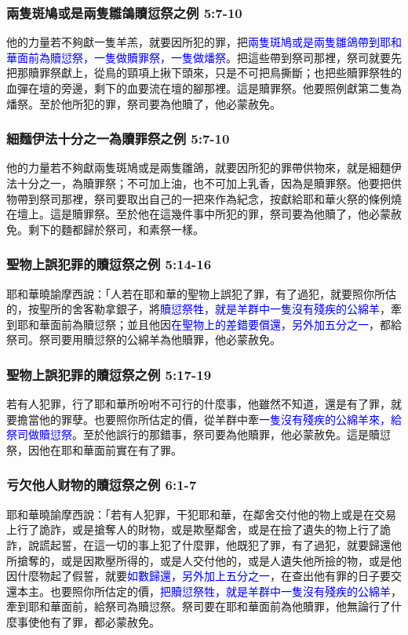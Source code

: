 \subsubsection{兩隻斑鳩或是兩隻雛鴿贖愆祭之例 5:7-10}
他的力量若不夠獻一隻羊羔，就要因所犯的罪，把\textcolor{blue}{兩隻斑鳩或是兩隻雛鴿帶到耶和華面前為贖愆祭，一隻做贖罪祭，一隻做燔祭}。把這些帶到祭司那裡，祭司就要先把那贖罪祭獻上，從鳥的頸項上揪下頭來，只是不可把鳥撕斷；也把些贖罪祭牲的血彈在壇的旁邊，剩下的血要流在壇的腳那裡。這是贖罪祭。他要照例獻第二隻為燔祭。至於他所犯的罪，祭司要為他贖了，他必蒙赦免。

\subsubsection{細麵伊法十分之一為贖罪祭之例 5:7-10}
他的力量若不夠獻兩隻斑鳩或是兩隻雛鴿，就要因所犯的罪帶供物來，就是細麵伊法十分之一，為贖罪祭；不可加上油，也不可加上乳香，因為是贖罪祭。他要把供物帶到祭司那裡，祭司要取出自己的一把來作為紀念，按獻給耶和華火祭的條例燒在壇上。這是贖罪祭。至於他在這幾件事中所犯的罪，祭司要為他贖了，他必蒙赦免。剩下的麵都歸於祭司，和素祭一樣。

\subsubsection{聖物上誤犯罪的贖愆祭之例 5:14-16}
耶和華曉諭摩西說：「人若在耶和華的聖物上誤犯了罪，有了過犯，就要照你所估的，按聖所的舍客勒拿銀子，將\textcolor{blue}{贖愆祭牲，就是羊群中一隻沒有殘疾的公綿羊}，牽到耶和華面前為贖愆祭；並且他因\textcolor{blue}{在聖物上的差錯要償還，另外加五分之一}，都給祭司。祭司要用贖愆祭的公綿羊為他贖罪，他必蒙赦免。

\subsubsection{聖物上誤犯罪的贖愆祭之例 5:17-19}
若有人犯罪，行了耶和華所吩咐不可行的什麼事，他雖然不知道，還是有了罪，就要擔當他的罪孽。也要照你所估定的價，從羊群中牽\textcolor{blue}{一隻沒有殘疾的公綿羊來，給祭司做贖愆祭}。至於他誤行的那錯事，祭司要為他贖罪，他必蒙赦免。這是贖愆祭，因他在耶和華面前實在有了罪。

\subsubsection{亏欠他人财物的贖愆祭之例 6:1-7}
耶和華曉諭摩西說：「若有人犯罪，干犯耶和華，在鄰舍交付他的物上或是在交易上行了詭詐，或是搶奪人的財物，或是欺壓鄰舍，或是在撿了遺失的物上行了詭詐，說謊起誓，在這一切的事上犯了什麼罪，他既犯了罪，有了過犯，就要歸還他所搶奪的，或是因欺壓所得的，或是人交付他的，或是人遺失他所撿的物，或是他因什麼物起了假誓，就要\textcolor{blue}{如數歸還，另外加上五分之一}，在查出他有罪的日子要交還本主。也要照你所估定的價，\textcolor{blue}{把贖愆祭牲，就是羊群中一隻沒有殘疾的公綿羊}，牽到耶和華面前，給祭司為贖愆祭。祭司要在耶和華面前為他贖罪，他無論行了什麼事使他有了罪，都必蒙赦免。

